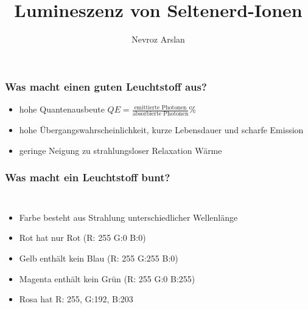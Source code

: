 \documentclass{beamer}
\title{Lumineszenz von Seltenerd-Ionen}
\author{Nevroz Arslan}
\newcommand{\makemycolor}[2]{%
    \pgfmathsetmacro{\hue}{(#1/100)^1.715*0.79}%
    \definecolor{myhsbcolor}{hsb}{\hue,1,1}%
    \textcolor{myhsbcolor}{#2}%
}
\begin{document}
  {%
    \frame{\titlepage}
  }

\begin{frame}[t]\frametitle{Was macht einen guten Leuchtstoff aus?}
\pause
\begin{itemize}
   \item hohe Quantenausbeute $QE = \frac{\text{emittierte \ Photonen}}{\text{absorbierte Photonen}}\%$
   \pause
   \item hohe Übergangswahrscheinlichkeit, kurze Lebensdauer und scharfe Emission 
   \pause
   \item geringe Neigung zu strahlungsloser Relaxation  Wärme
\end{itemize}
   
\end{frame}

\begin{frame}[t]\frametitle{Was macht ein Leuchtstoff bunt?}

\begin{columns}
    \begin{itemize}
    \item \footnotesize Farbe besteht aus Strahlung unterschiedlicher Wellenlänge
    \item \footnotesize {\color[RGB]{255,0,0}Rot} hat nur Rot (R: 255 G:0 B:0)
        \item \footnotesize {\color[RGB]{255,255,0}Gelb} enthält kein Blau (R: 255 G:255 B:0)
    \item \footnotesize {\color[RGB]{255,0,255}Magenta} enthält kein Grün (R: 255 G:0 B:255)
    \item \footnotesize {\color[RGB]{255, 192, 203} Rosa }hat  R: 255, G:192, B:203 
    \end{itemize}

\end{columns}

\end{frame}
\end{document}
